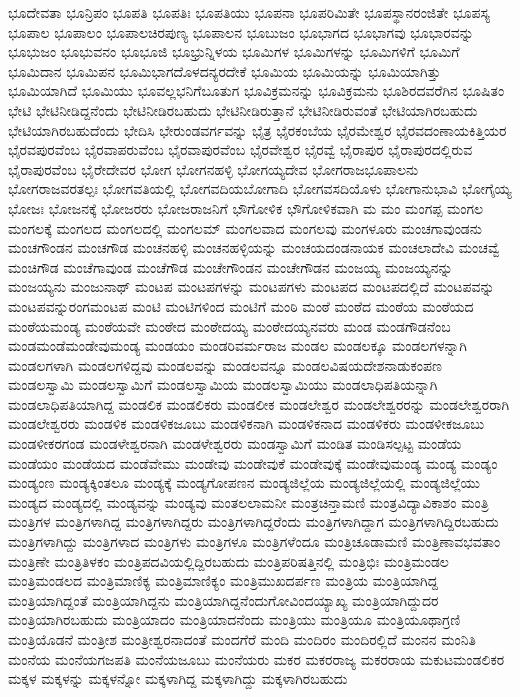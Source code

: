 {ಭೂದೇವತಾ
ಭೂನ್ರಿಪಂ
ಭೂಪತಿ
ಭೂಪತಿಃ
ಭೂಪತಿಯು
ಭೂಪನಾ
ಭೂಪರಿಮಿತೇ
ಭೂಪಸ್ಥಾನರಂಜಿತೇ
ಭೂಪಸ್ಯ
ಭೂಪಾಲ
ಭೂಪಾಲಂ
ಭೂಪಾಲಚಿರಪುಣ್ಯ
ಭೂಪಾಲನ
ಭೂಬುಜಂ
ಭೂಭಾಗದ
ಭೂಭಾಗವು
ಭೂಭಾರವನ್ನು
ಭೂಭುಜಂ
ಭೂಭುವನಂ
ಭೂಭೂಜಿ
ಭೂಭ್ರುನ್ನಿಳಯ
ಭೂಮಿಗಳ
ಭೂಮಿಗಳನ್ನು
ಭೂಮಿಗಳಿಗೆ
ಭೂಮಿಗೆ
ಭೂಮಿದಾನ
ಭೂಮಿಪನ
ಭೂಮಿಭಾಗದೊಳದನ್ಯರದೇಕೆ
ಭೂಮಿಯ
ಭೂಮಿಯನ್ನು
ಭೂಮಿಯಾಗಿತ್ತು
ಭೂಮಿಯಾಗಿದೆ
ಭೂಮಿಯು
ಭೂವಲ್ಲಭನಿಗೆಬೂತುಗ
ಭೂವಿಕ್ರಮನನ್ನು
ಭೂವಿಕ್ರಮನು
ಭೂಶಿರದವರೆಗಿನ
ಭೂಷಿತಂ
ಭೇಟಿ
ಭೇಟಿನೀಡಿದ್ದನೆಂದು
ಭೇಟಿನೀಡಿರಬಹುದು
ಭೇಟಿನೀಡಿರುತ್ತಾನೆ
ಭೇಟಿನೀಡಿರುವಂತೆ
ಭೇಟಿಯಾಗಿರಬಹುದು
ಭೇಟಿಯಾಗಿರಬಹುದೆಂದು
ಭೇದಿಸಿ
ಭೇರುಂಡವರ್ಗವನ್ನು
ಭೈತ್ರ
ಭೈರಕಂಬೆಯ
ಭೈರಮೇಶ್ವರ
ಭೈರವದಂಣಾಯಕಿತ್ತಿಯರ
ಭೈರವಪುರವೆಂಬ
ಭೈರವಾಪರುವೆಂಬ
ಭೈರವಾಪುರವೆಂಬ
ಭೈರವೇಶ್ವರ
ಭೈರವ್ವೆ
ಭೈರಾಪುರ
ಭೈರಾಪುರದಲ್ಲಿರುವ
ಭೈರಾಪುರವೆಂಬ
ಭೈರೇದೇವರ
ಭೋಗ
ಭೋಗನಹಳ್ಳಿ
ಭೋಗಯ್ಯದೇವ
ಭೋಗರಾಜಭೂಪಾಲನು
ಭೋಗರಾಜವರತಲ್ಪಃ
ಭೋಗವತಿಯಲ್ಲಿ
ಭೋಗವದಿಯಬೋಗಾದಿ
ಭೋಗವಸದಿಯೊಳು
ಭೋಗಾನುಭಾವಿ
ಭೋಗೈಯ್ಯ
ಭೋಜಃ
ಭೋಜನಕ್ಕೆ
ಭೋಜರರು
ಭೋಜರಾಜನಿಗೆ
ಭೌಗೋಳಿಕ
ಭೌಗೋಳಿಕವಾಗಿ
ಮ
ಮಂ
ಮಂಗಪ್ಪ
ಮಂಗಲ
ಮಂಗಲಕ್ಕೆ
ಮಂಗಲದ
ಮಂಗಲದಲ್ಲಿ
ಮಂಗಲಮ್
ಮಂಗಲವಾದ
ಮಂಗಲವು
ಮಂಗಳೂರು
ಮಂಚಗಾವುಂಡನು
ಮಂಚಗೌಂಡನ
ಮಂಚಗೌಡ
ಮಂಚನಹಳ್ಳಿ
ಮಂಚನಹಳ್ಳಿಯನ್ನು
ಮಂಚಯದಂಡನಾಯಕ
ಮಂಚಲಾದೇವಿ
ಮಂಚವ್ವೆ
ಮಂಚಿಗೌಡ
ಮಂಚೆಗಾವುಂಡ
ಮಂಚೆಗೌಡ
ಮಂಚೇಗೌಂಡನ
ಮಂಚೇಗೌಡನ
ಮಂಜಯ್ಯ
ಮಂಜಯ್ಯನನ್ನು
ಮಂಜಯ್ಯನು
ಮಂಜುನಾಥ್
ಮಂಟಪ
ಮಂಟಪಗಳನ್ನು
ಮಂಟಪಗಳು
ಮಂಟಪದ
ಮಂಟಪದಲ್ಲಿದೆ
ಮಂಟಪವನ್ನು
ಮಂಟಪವನ್ನುರಂಗಮಂಟಪ
ಮಂಟಿ
ಮಂಟಿಗಳಿಂದ
ಮಂಟಿಗೆ
ಮಂಠಿ
ಮಂಠೆ
ಮಂಠೆದ
ಮಂಠೆಯ
ಮಂಠೆಯದ
ಮಂಠೆಯಮಂಡ್ಯ
ಮಂಠೆಯವೇ
ಮಂಠೇದ
ಮಂಠೇದಯ್ಯ
ಮಂಠೇದಯ್ಯನವರು
ಮಂಡ
ಮಂಡಗೌಡನೆಂಬ
ಮಂಡಮಂಡೆಮಂಡೇವುಮಂಡ್ಯ
ಮಂಡಯಂ
ಮಂಡರಿವರ್ಮರಾಜ
ಮಂಡಲ
ಮಂಡಲಕ್ಕೂ
ಮಂಡಲಗಳನ್ನಾಗಿ
ಮಂಡಲಗಳಾಗಿ
ಮಂಡಲಗಳಿದ್ದವು
ಮಂಡಲವನ್ನು
ಮಂಡಲವನ್ನೂ
ಮಂಡಲವಿಷಯದೇಶನಾಡುಕಂಪಣ
ಮಂಡಲಸ್ವಾಮಿ
ಮಂಡಲಸ್ವಾಮಿಗೆ
ಮಂಡಲಸ್ವಾಮಿಯ
ಮಂಡಲಸ್ವಾಮಿಯು
ಮಂಡಲಾಧಿಪತಿಯನ್ನಾಗಿ
ಮಂಡಲಾಧಿಪತಿಯಾಗಿದ್ದ
ಮಂಡಲಿಕ
ಮಂಡಲಿಕರು
ಮಂಡಲೀಕ
ಮಂಡಲೇಶ್ವರ
ಮಂಡಲೇಶ್ವರರನ್ನು
ಮಂಡಲೇಶ್ವರರಾಗಿ
ಮಂಡಲೇಶ್ವರರು
ಮಂಡಳಿಕ
ಮಂಡಳಿಕಜೂಬು
ಮಂಡಳಿಕನಾಗಿ
ಮಂಡಳಿಕನಾದ
ಮಂಡಳಿಕರು
ಮಂಡಳೀಕಜೂಬು
ಮಂಡಳೀಕರಗಂಡ
ಮಂಡಳೇಶ್ವರನಾಗಿ
ಮಂಡಳೇಶ್ವರರು
ಮಂಡಸ್ವಾಮಿಗೆ
ಮಂಡಿತ
ಮಂಡಿಸಲ್ಪಟ್ಟ
ಮಂಡೆಯ
ಮಂಡೆಯಂ
ಮಂಡೆಯದ
ಮಂಡೆವೇಮು
ಮಂಡೇವು
ಮಂಡೇವುಕೆ
ಮಂಡೇವುಕ್ಕೆ
ಮಂಡೇವುಮಂಡ್ಯ
ಮಂಡ್ಯ
ಮಂಡ್ಯಂ
ಮಂಡ್ಯಂಣ
ಮಂಡ್ಯಕ್ಕಿಂತಲೂ
ಮಂಡ್ಯಕ್ಕೆ
ಮಂಡ್ಯಗೋಪಣನ
ಮಂಡ್ಯಜಿಲ್ಲೆಯ
ಮಂಡ್ಯಜಿಲ್ಲೆಯಲ್ಲಿ
ಮಂಡ್ಯಜಿಲ್ಲೆಯು
ಮಂಡ್ಯದ
ಮಂಡ್ಯದಲ್ಲಿ
ಮಂಡ್ಯವನ್ನು
ಮಂಡ್ಯವು
ಮಂತಲಲಾಮನೀ
ಮಂತ್ರಚಿನ್ತಾಮಣಿ
ಮಂತ್ರವಿದ್ಯಾವಿಕಾಶಂ
ಮಂತ್ರಿ
ಮಂತ್ರಿಗಳ
ಮಂತ್ರಿಗಳಾಗಿದ್ದ
ಮಂತ್ರಿಗಳಾಗಿದ್ದರು
ಮಂತ್ರಿಗಳಾಗಿದ್ದರೆಂದು
ಮಂತ್ರಿಗಳಾಗಿದ್ದಾಗ
ಮಂತ್ರಿಗಳಾಗಿದ್ದಿರಬಹುದು
ಮಂತ್ರಿಗಳಾಗಿದ್ದು
ಮಂತ್ರಿಗಳಾದ
ಮಂತ್ರಿಗಳು
ಮಂತ್ರಿಗಳೂ
ಮಂತ್ರಿಗಳೆಂದೂ
ಮಂತ್ರಿಚೂಡಾಮಣಿ
ಮಂತ್ರಿಣಾವಭವತಾಂ
ಮಂತ್ರಿಣೇ
ಮಂತ್ರಿತಿಳಕಂ
ಮಂತ್ರಿಪದವಿಯಲ್ಲಿದ್ದಿರಬಹುದು
ಮಂತ್ರಿಪರಿಷತ್ತಿನಲ್ಲಿ
ಮಂತ್ರಿಭಿಃ
ಮಂತ್ರಿಮಂಡಲ
ಮಂತ್ರಿಮಂಡಲದ
ಮಂತ್ರಿಮಾಣಿಕ್ಯ
ಮಂತ್ರಿಮಾಣಿಕ್ಯಂ
ಮಂತ್ರಿಮುಖದರ್ಪಣ
ಮಂತ್ರಿಯ
ಮಂತ್ರಿಯಾಗಿದ್ದ
ಮಂತ್ರಿಯಾಗಿದ್ದಂತೆ
ಮಂತ್ರಿಯಾಗಿದ್ದನು
ಮಂತ್ರಿಯಾಗಿದ್ದನೆಂದುಗೋವಿಂದಯ್ಯಾಖ್ಯ
ಮಂತ್ರಿಯಾಗಿದ್ದುದರ
ಮಂತ್ರಿಯಾಗಿರಬಹುದು
ಮಂತ್ರಿಯಾದಂ
ಮಂತ್ರಿಯಾದನೆಂದು
ಮಂತ್ರಿಯು
ಮಂತ್ರಿಯೂ
ಮಂತ್ರಿಯೂಥಾಗ್ರಣಿ
ಮಂತ್ರಿಯೊಡನೆ
ಮಂತ್ರೀಶ
ಮಂತ್ರೀಶ್ವರನಾದಂತೆ
ಮಂದಗೆರೆ
ಮಂದಿ
ಮಂದಿರಂ
ಮಂದಿರಲ್ಲಿದೆ
ಮಂನನ
ಮಂನಿತಿ
ಮಂನೆಯ
ಮಂನೆಯಗಜಪತಿ
ಮಂನೆಯಜೂಬು
ಮಂನೆಯರು
ಮಕರ
ಮಕರರಾಜ್ಯ
ಮಕರರಾಯ
ಮಕುಟಮಂಡಲಿಕರ
ಮಕ್ಕಳ
ಮಕ್ಕಳನ್ನು
ಮಕ್ಕಳನ್ನೋ
ಮಕ್ಕಳಾಗಿದ್ದ
ಮಕ್ಕಳಾಗಿದ್ದು
ಮಕ್ಕಳಾಗಿರಬಹುದು
}
